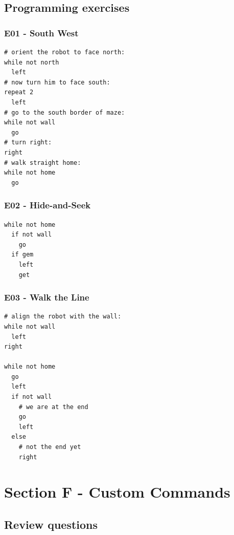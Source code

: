 \documentclass[article,A4,12pt]{llncs}
\begin{document}
\subsection{Programming exercises}

\subsubsection{E01 - South West}
\begin{verbatim}
# orient the robot to face north:
while not north
  left
# now turn him to face south:
repeat 2
  left
# go to the south border of maze:
while not wall
  go
# turn right:
right
# walk straight home:
while not home
  go
\end{verbatim}

\subsubsection{E02 - Hide-and-Seek}
\begin{verbatim}
while not home
  if not wall
    go
  if gem
    left
    get
\end{verbatim}

\subsubsection{E03 - Walk the Line}
\begin{verbatim}
# align the robot with the wall:
while not wall
  left
right

while not home
  go
  left
  if not wall
    # we are at the end
    go
    left
  else
    # not the end yet
    right
\end{verbatim}


\section{Section F - Custom Commands}

\subsection{Review questions}
\end{document}
